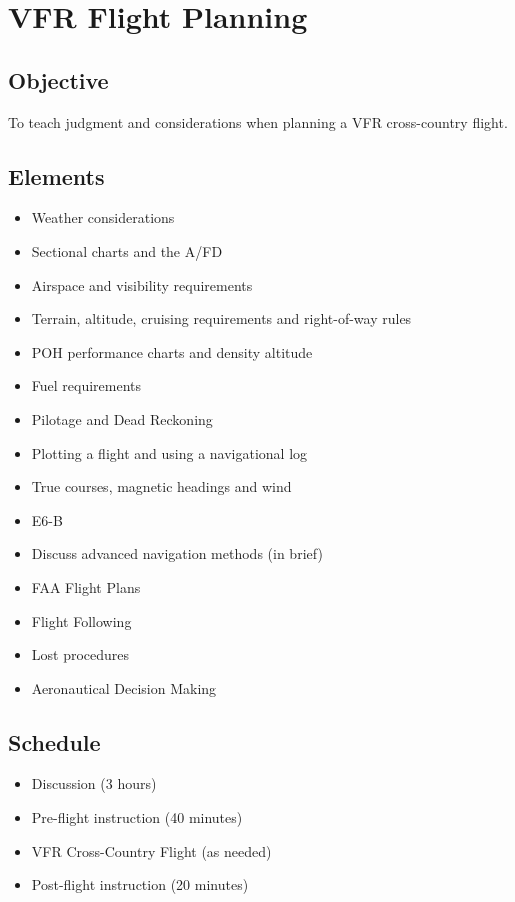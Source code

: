 \section{VFR Flight Planning}

\subsection{Objective}

To teach judgment and considerations when planning a VFR cross-country flight.

\subsection{Elements}

\begin{itemize}
  \item Weather considerations
  \item Sectional charts and the A/FD
  \item Airspace and visibility requirements
  \item Terrain, altitude, cruising requirements and right-of-way rules
  \item POH performance charts and density altitude
  \item Fuel requirements
  \item Pilotage and Dead Reckoning
  \item Plotting a flight and using a navigational log
  \item True courses, magnetic headings and wind
  \item E6-B
  \item Discuss advanced navigation methods (in brief)
  \item FAA Flight Plans
  \item Flight Following
  \item Lost procedures
  \item Aeronautical Decision Making
\end{itemize}

\subsection{Schedule}

\begin{itemize}
  \item Discussion (3 hours)
  \item Pre-flight instruction (40 minutes)
  \item VFR Cross-Country Flight (as needed)
  \item Post-flight instruction (20 minutes)
\end{itemize}

